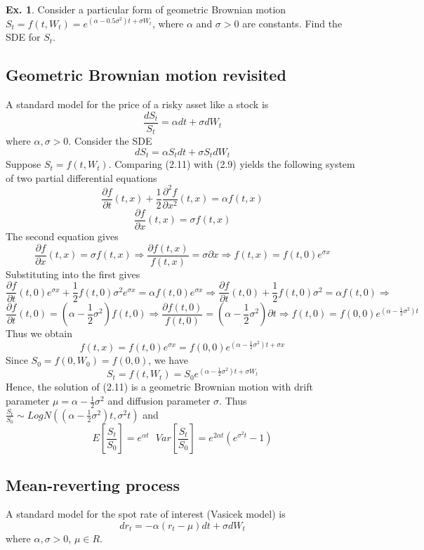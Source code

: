 \documentclass[11pt,a4paper]{book}
\theoremstyle{definition}\newtheorem{definition}{Definition}
\theoremstyle{definition}\newtheorem{fact}{Fact}
\theoremstyle{definition}\newtheorem{remark}{Remark}
\theoremstyle{definition}\newtheorem{ex}{Ex.}
\theoremstyle{definition}\newtheorem{project}{Project}
\theoremstyle{definition}\newtheorem{problem}{Problem}
\theoremstyle{definition}\newtheorem{example}{Example}
\numberwithin{theorem}{section}
\numberwithin{corollary}{chapter}
\numberwithin{assumption}{chapter}
\numberwithin{definition}{chapter}
\numberwithin{prop}{chapter}
\numberwithin{notation}{chapter}
\numberwithin{problem}{chapter}
\numberwithin{example}{chapter}
\numberwithin{fact}{chapter}
\numberwithin{ex}{chapter}
\begin{document}
\begin{ex}
Consider a particular form of geometric Brownian motion $S_t = f(t,W_t) = e^{(\alpha - 0.5 \sigma^2)t + \sigma W_t}$, where $\alpha$ and $\sigma > 0$ are constants. Find the SDE for $S_t$.
\end{ex}

\subsection{Geometric Brownian motion revisited}
A standard model for the price of a risky asset like a stock is
$$ \frac{dS_t}{S_t} = \alpha dt + \sigma dW_t $$
where $\alpha, \sigma >0$. Consider the SDE
\begin{equation}
dS_t = \alpha S_t dt + \sigma S_t dW_t
\end{equation}
Suppose $S_t = f(t,W_t)$. Comparing (2.11) with (2.9) yields the following system of two partial differential equations
$$ \frac{\partial f}{\partial t}(t,x) + \frac{1}{2}\frac{\partial^2 f}{\partial x^2}(t,x) = \alpha f(t,x) $$
$$ \frac{\partial f}{\partial x}(t,x) = \sigma f(t,x) $$
The second equation gives
$$ \frac{\partial f}{\partial x}(t,x) = \sigma f(t,x) \Longrightarrow \frac{\partial f(t,x)}{f(t,x)} = \sigma \partial x \Longrightarrow f(t,x) = f(t,0)e^{\sigma x} $$
Substituting into the first gives
$$ \frac{\partial f}{\partial t}(t,0)e^{\sigma x} + \frac{1}{2}f(t,0)\sigma^2 e^{\sigma x} = \alpha f(t,0) e^{\sigma x} \Longrightarrow \frac{\partial f}{\partial t}(t,0) + \frac{1}{2}f(t,0)\sigma^2 = \alpha f(t,0) \Longrightarrow$$
$$ \frac{\partial f}{\partial t}(t,0) = \left(\alpha - \frac{1}{2}\sigma^2 \right) f(t,0) \Longrightarrow \frac{\partial f(t,0)}{f(t,0)} = \left(\alpha - \frac{1}{2}\sigma^2 \right) \partial t \Longrightarrow f(t,0) = f(0,0) e^{(\alpha - \frac{1}{2}\sigma^2)t} $$
Thus we obtain
$$f(t,x) = f(t,0)e^{\sigma x} = f(0,0)e^{(\alpha - \frac{1}{2}\sigma^2)t+\sigma x} $$
Since $S_0 = f(0,W_0) = f(0,0)$, we have
$$ S_t = f(t,W_t) = S_0 e^{(\alpha - \frac{1}{2}\sigma^2)t + \sigma W_t} $$
Hence, the solution of (2.11) is a geometric Brownian motion with drift parameter $\mu = \alpha - \frac{1}{2}\sigma^2$ and diffusion parameter $\sigma$. Thus $\frac{S_t}{S_0} \sim LogN( (\alpha-\frac{1}{2}\sigma^2)t, \sigma^2 t)$ and
$$ E\left[ \frac{S_t}{S_0} \right] = e^{\alpha t} \text{           } Var\left[ \frac{S_t}{S_0} \right] = e^{2\alpha t}(e^{\sigma^2t}-1) $$

\subsection{Mean-reverting process}
A standard model for the spot rate of interest (Vasicek model) is
$$ dr_t = -\alpha (r_t -\mu)dt + \sigma dW_t $$
where $\alpha, \sigma>0$, $\mu \in R$.
\end{document}
